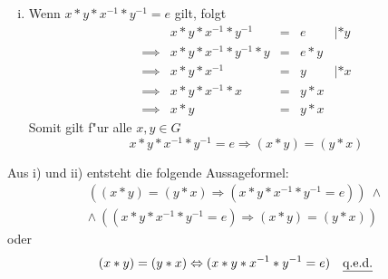 \begin{enumerate}[(a)]
\begin{enumerate}[i)]
            \item Wenn $x * y * x^{-1} * y^{-1} = e$ gilt, folgt
                \begin{equation*}
                    \begin{array}{rrcll}
                                 &x * y * x^{-1} * y^{-1} &=& e &| * y \\[5pt]
                        \implies &x * y * x^{-1} * y^{-1} * y &=& e * y \\[5pt]
                        \implies &x * y * x^{-1} &=& y &| * x \\[5pt]
                        \implies &x * y * x^{-1} * x &=& y * x \\[5pt]
                        \implies &x * y &=& y * x
                    \end{array}
                \end{equation*}
                Somit gilt f"ur alle $x, y \in G$
                $$x * y * x^{-1} * y^{-1} = e \Rightarrow (x * y) = (y * x)$$
        \end{enumerate}
        Aus i) und ii) entsteht die folgende Aussageformel:
        \begin{gather*}
            ((x * y) = (y * x) \Rightarrow (x * y * x^{-1} * y^{-1} = e))\ \land \\
            \land\ ((x * y * x^{-1} * y^{-1} = e) \Rightarrow (x * y) = (y * x))
        \end{gather*}
        oder
        \begin{equation*}
            (x * y) = (y * x) \Leftrightarrow (x * y * x^{-1} * y^{-1} = e) \quad \text{\underline{q.e.d.}}
        \end{equation*}
\end{enumerate}
